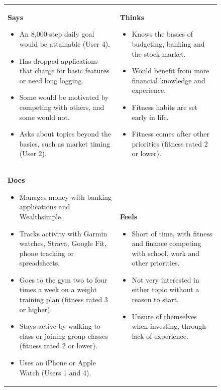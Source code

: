 \documentclass[12pt]{article}
\begin{document}
\begin{figure}[htbp]
\centering
\footnotesize
\renewcommand{\arraystretch}{1.15}
\newcommand{\mapcell}[2]{\textbf{#1}
  \begin{itemize}[leftmargin=1.2em, itemsep=1pt, parsep=0pt, topsep=2pt,
    after=\vspace{2pt}]#2\end{itemize}}
\begin{tabular}{|>{\raggedright\arraybackslash}p{}
  |>{\raggedright\arraybackslash}p{}|}
\hline
\multicolumn{2}{|c|}{\rule{0pt}{2.6ex}\textbf{Novice young adult} (Users 1--6)}\\
\hline
\mapcell{Says}{
  \item An 8,000-step daily goal would be attainable (User 4).
  \item Has dropped applications that charge for basic features or need
    long logging.
  \item Some would be motivated by competing with others, and some would
    not.
  \item Asks about topics beyond the basics, such as market timing
    (User 2).}
&
\mapcell{Thinks}{
  \item Knows the basics of budgeting, banking and the stock market.
  \item Would benefit from more financial knowledge and experience.
  \item Fitness habits are set early in life.
  \item Fitness comes after other priorities (fitness rated 2 or lower).}
\\ \hline
\mapcell{Does}{
  \item Manages money with banking applications and Wealthsimple.
  \item Tracks activity with Garmin watches, Strava, Google Fit, phone
    tracking or spreadsheets.
  \item Goes to the gym two to four times a week on a weight training
    plan (fitness rated 3 or higher).
  \item Stays active by walking to class or joining group classes
    (fitness rated 2 or lower).
  \item Uses an iPhone or Apple Watch (Users 1 and 4).}
&
\mapcell{Feels}{
  \item Short of time, with fitness and finance competing with school,
    work and other priorities.
  \item Not very interested in either topic without a reason to start.
  \item Unsure of themselves when investing, through lack of experience.}

\end{tabular}
\end{figure}
\end{document}
